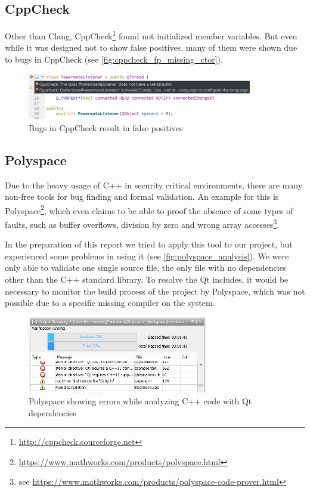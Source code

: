 \documentclass{scrreprt}
\begin{document}
\subsection{CppCheck} Other than Clang, CppCheck\footnote{\url{http://cppcheck.sourceforge.net}} found not initialized member variables. But even while it was designed not to show false positives, many of them were shown due to bugs in CppCheck (see \vref{fig:cppcheck_fp_missing_ctor}).

\begin{figure}[h]
	\centering
	\includegraphics[width=0.9\textwidth]{img/cppcheck_fp_missing_ctor}
	\caption[Bugs in CppCheck]{Bugs in CppCheck result in false positives}
	\label{fig:cppcheck_fp_missing_ctor}
\end{figure}

\subsection{Polyspace} Due to the heavy usage of C++ in security critical environments, there are many non-free tools for bug finding and formal validation. An example for this is Polyspace\footnote{\url{https://www.mathworks.com/products/polyspace.html}}, which even claims to be able to proof the absence of some types of faults, such as buffer overflows, division by zero and wrong array accesses\footnote{see \url{https://www.mathworks.com/products/polyspace-code-prover.html}}.

In the preparation of this report we tried to apply this tool to our project, but experienced some problems in using it (see \vref{fig:polyspace_analysis}). We were only able to validate one single source file, the only file with no dependencies other than the C++ standard library. To resolve the Qt includes, it would be necessary to monitor the build process of the project by Polyspace, which was not possible due to a specific missing compiler on the system.

\begin{figure}[h]
	\centering
	\includegraphics[width=0.7\textwidth]{img/polyspace_analysis}
	\caption[Polyspace Analysis]{Polyspace showing errors while analyzing C++ code with Qt dependencies}
	\label{fig:polyspace_analysis}
\end{figure}
\end{document}
